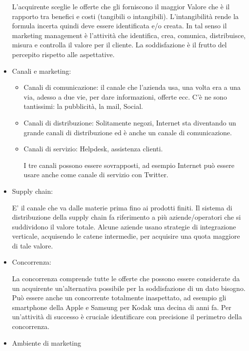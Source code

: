 \documentclass[11pt]{article}
\begin{document}
\begin{itemize}[topsep=0ex]
	L'acquirente sceglie le offerte che gli forniscono il maggior Valore che è il rapporto tra benefici e costi (tangibili o intangibili). L'intangibilità rende la formula incerta quindi deve essere identificata e/o creata. \newline
	In tal senso il marketing management è l'attività che identifica, crea, comunica, distribuisce, misura e controlla il valore per il cliente.\newline
	La soddisfazione è il frutto del percepito rispetto alle aspettative.
	\item Canali e marketing:
	\begin{itemize}[noitemsep,topsep=0ex]
		\item Canali di comunicazione: il canale che l'azienda usa, una volta era a una via, adesso a due vie, per dare informazioni, offerte ecc. C'è ne sono tantissimi: la pubblicità, la mail, Social.
		\item Canali di distribuzione: Solitamente negozi, Internet sta diventando un grande canali di distribuzione ed è anche un canale di comunicazione.
		\item Canali di servizio: Helpdesk, assistenza clienti.
		
		I tre canali possono essere sovrapposti, ad esempio Internet può essere usare anche come canale di servizio con Twitter.
	\end{itemize}
	\item Supply chain:
	
	E' il canale che va dalle materie prima fino ai prodotti finiti. 
	Il sistema di distribuzione della supply chain fa riferimento a più aziende/operatori che si suddividono il valore totale.
	Alcune aziende usano strategie di integrazione verticale, acquisendo le catene intermedie, per acquisire una quota maggiore di tale valore.
	\item Concorrenza:
	
	La concorrenza comprende tutte le offerte che possono essere considerate da un acquirente un'alternativa possibile per la soddisfazione di un dato bisogno. Può essere anche un concorrente totalmente inaspettato, ad esempio gli smartphone della Apple e Samsung per Kodak una decina di anni fa.\newline
	Per un'attività di successo è cruciale identificare con precisione il perimetro della concorrenza.
	\item Ambiente di marketing
\end{itemize}
\end{document}
